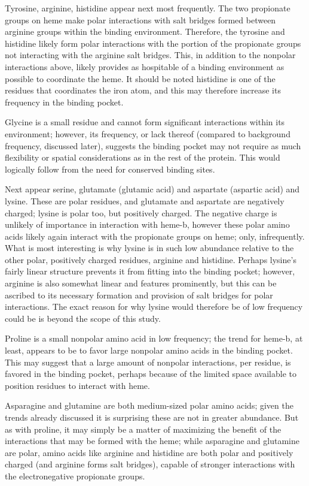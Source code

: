 \documentclass[a4paper, nobind]{templates/ociamthesis}
\begin{document}
Tyrosine, arginine, histidine appear next most frequently. The two propionate groups on heme make polar interactions with salt bridges formed between arginine groups within the binding environment\autocite{Barrows2005}. Therefore, the tyrosine and histidine likely form polar interactions with the portion of the propionate groups not interacting with the arginine salt bridges. This, in addition to the nonpolar interactions above, likely provides as hospitable of a binding environment as possible to coordinate the heme. It should be noted histidine is one of the residues that coordinates the iron atom, and this may therefore increase its frequency in the binding pocket.

Glycine is a small residue and cannot form significant interactions within its environment; however, its frequency, or lack thereof (compared to background frequency, discussed later), suggests the binding pocket may not require as much flexibility or spatial considerations as in the rest of the protein. This would logically follow from the need for conserved binding sites.

Next appear serine, glutamate (glutamic acid) and aspartate (aspartic acid) and lysine. These are polar residues, and glutamate and aspartate are negatively charged; lysine is polar too, but positively charged. The negative charge is unlikely of importance in interaction with heme-b, however these polar amino acids likely again interact with the propionate groups on heme; only, infrequently. What is most interesting is why lysine is in such low abundance relative to the other polar, positively charged residues, arginine and histidine. Perhaps lysine's fairly linear structure prevents it from fitting into the binding pocket; however, arginine is also somewhat linear and features prominently, but this can be ascribed to its necessary formation and provision of salt bridges for polar interactions. The exact reason for why lysine would therefore be of low frequency could be is beyond the scope of this study.

Proline is a small nonpolar amino acid in low frequency; the trend for heme-b, at least, appears to be to favor large nonpolar amino acids in the binding pocket. This may suggest that a large amount of nonpolar interactions, per residue, is favored in the binding pocket, perhaps because of the limited space available to position residues to interact with heme.

Asparagine and glutamine are both medium-sized polar amino acids; given the trends already discussed it is surprising these are not in greater abundance. But as with proline, it may simply be a matter of maximizing the benefit of the interactions that may be formed with the heme; while asparagine and glutamine are polar, amino acids like arginine and histidine are both polar and positively charged (and arginine forms salt bridges), capable of stronger interactions with the electronegative propionate groups.
\end{document}
